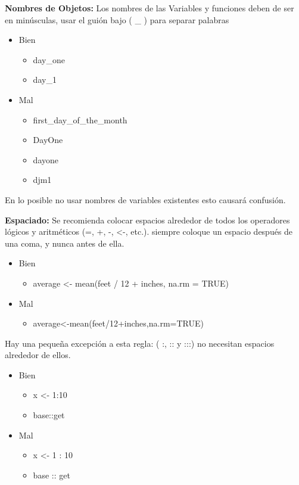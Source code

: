 \begin{enumerate}
\textbf{Nombres de Objetos:} Los nombres de las Variables y funciones deben de ser en min\'usculas, usar el gui\'on bajo ( \_ ) para separar palabras  
\begin{itemize}
\item Bien  
\begin{itemize}
     \item day\_one
     \item day\_1
  \end{itemize}
\item Mal
   \begin{itemize}
      \item first\_day\_of\_the\_month
      \item DayOne
      \item dayone
      \item djm1
    \end{itemize}
 \end{itemize}
En lo posible no usar nombres de variables existentes esto causar\'a confusi\'on.

\textbf{Espaciado:} Se recomienda colocar espacios alrededor de todos los operadores l\'ogicos y aritm\'eticos (=, +, -, \textless-, etc.). siempre coloque un espacio despu\'es de una coma, y nunca antes de ella.

\begin{itemize}
\item Bien  
\begin{itemize}
     \item average \textless- mean(feet / 12 + inches, na.rm = TRUE)
  \end{itemize}
\item Mal
   \begin{itemize}
      \item average\textless-mean(feet/12+inches,na.rm=TRUE)
   \end{itemize}
 \end{itemize}
 
Hay una pequeña excepci\'on a esta regla: ( :, :: y :::) no necesitan espacios alrededor de ellos.

\begin{itemize}
\item Bien  
\begin{itemize}
     \item x \textless- 1:10
     \item base::get
  \end{itemize}
\item Mal
   \begin{itemize}
      \item x \textless- 1 : 10
     \item base :: get
   \end{itemize}
 \end{itemize}


\end{enumerate}
